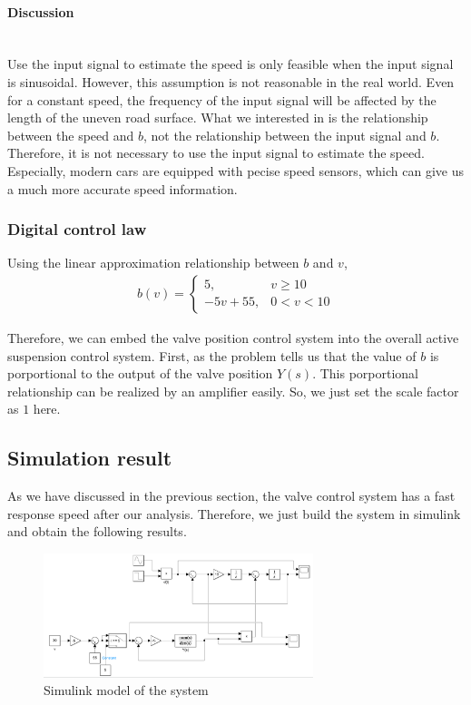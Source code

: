 \documentclass{article}
\newcommand{\subsubsubsection}[1]{\paragraph{#1}\mbox{}\\}
\begin{document}
\subsubsubsection{Discussion}

Use the input signal to estimate the speed is only feasible when the input signal is sinusoidal.
However, this assumption is not reasonable in the real world.
Even for a constant speed, the frequency of the input signal will be affected by 
the length of the uneven road surface.
What we interested in is the relationship between the speed and $b$,
not the relationship between the input signal and $b$.
Therefore, it is not necessary to use the input signal to estimate the speed.
Especially, modern cars are equipped with pecise speed sensors,
which can give us a much more accurate speed information.\\

\subsubsection{Digital control law}

Using the linear approximation relationship between $b$ and $v$,
\begin{align*}
    b(v) = \begin{cases}
        5, & v\geq 10\\
        -5v+55, & 0<v<10
    \end{cases}
\end{align*}

Therefore, we can embed the valve position control system into the overall active suspension control system.
First, as the problem tells us that 
the value of $b$ is porportional to the output of the valve position $Y(s)$.
This porportional relationship can be realized by an amplifier easily.
So, we just set the scale factor as $1$ here.\\

\subsection{Simulation result}

As we have discussed in the previous section,
the valve control system has a fast response speed after our analysis.
Therefore, we just build the system in simulink and obtain the following results.\\

\begin{figure}[htbp]
    \centering
    \includegraphics[width=0.7\textwidth]{24.png}
    \caption{Simulink model of the system}
\end{figure}
\end{document}
